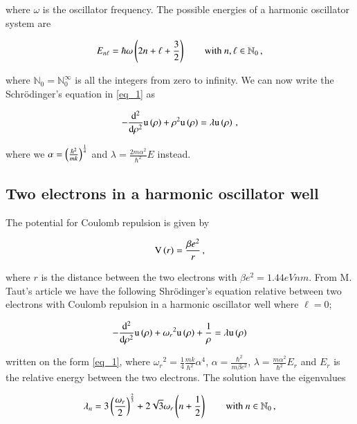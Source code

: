 \documentclass[11pt,english,a4paper]{article}
\begin{document}
\begin{flushleft}
where $\omega$ is the oscillator frequency. The possible energies of a harmonic oscillator system are

\begin{align}
E_{n\ell} = \hbar\omega\left({2n+\ell+\frac{3}{2}}\right) \qquad \text{with } n,\ell\in\mathbb{N}_0 \,,
\label{eq_3}
\end{align}

where $\mathbb{N}_0 = \mathbb{N}_0^{\infty}$ is all the integers from zero to infinity.  We can now write the Schr\"{o}dinger's equation in \eqref{eq_1} as 

\begin{align}
-\frac{\mathrm{d}^2}{\mathrm{d}\rho^2} \mathrm{u}\left({\rho}\right) + \rho^2 \mathrm{u}\left({\rho}\right) = \lambda\mathrm{u}\left({\rho}\right) \,,
\label{eq_4}
\end{align}

where we $\alpha = \left({\frac{\hbar^2}{m k}}\right)^{\frac{1}{4}}$ and $\lambda = \frac{2m\alpha^2}{\hbar^2} E$ instead.

\subsection{Two electrons in a harmonic oscillator well}

The potential for Coulomb repulsion is given by 

\begin{align*}
\mathrm{V}\left({r}\right) = \frac{\beta e^2}{r} \,,
\end{align*}

where $r$ is the distance between the two electrons with $\beta e^2 = 1.44\unit{eVnm}$. From M. Taut's article \cite{TwoElectron} we have the following Shr\"{o}dinger's equation relative between two electrons with Coulomb repulsion in a harmonic oscillator well where $\ell = 0$;

\begin{align}
-\frac{\mathrm{d}^2}{\mathrm{d}\rho^2} \mathrm{u}\left({\rho}\right) + {\omega_r}^2\mathrm{u}\left({\rho}\right) + \frac{1}{\rho} = \lambda \mathrm{u}\left({\rho}\right) 
\label{eq_5}
\end{align}

written on the form \eqref{eq_1}, where ${\omega_r}^2 = \frac{1}{4}\frac{mk}{\hbar^2} \alpha^4$, $\alpha = \frac{\hbar^2}{m\beta e^2}$, $\lambda = \frac{m\alpha^2}{\hbar^2} E_r$ and $E_r$ is the relative energy between the two electrons. The solution have the eigenvalues

\begin{align}
\lambda_n = 3\left({\frac{\omega_r}{2}}\right)^{\frac{2}{3}} + 2\sqrt{3}\omega_r\left({n+\frac{1}{2}}\right) \qquad \text{with } n \in \mathbb{N}_0 \,,
\label{eq_6}
\end{align}


\end{flushleft}
\end{document}
